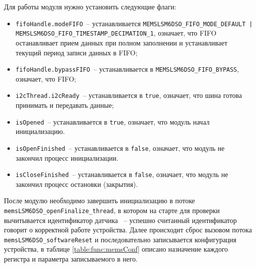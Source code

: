 Для работы модуля нужно установить следующие флаги:

\begin{itemize}
    \item \lstinline{fifoHandle.modeFIFO}~-- устанавливается \lstinline{MEMSLSM6DSO_FIFO_MODE_DEFAULT | MEMSLSM6DSO_FIFO_TIMESTAMP_DECIMATION_1},
    означает, что FIFO останавливает прием данных при полном заполнении и устанавливает текущий период записи данных в FIFO;
    \item \lstinline{fifoHandle.bypassFIFO}~-- устанавливается в \lstinline{MEMSLSM6DSO_FIFO_BYPASS}, означает, что FIFO;
    \item \lstinline{i2cThread.i2cReady}~-- устанавливается в \lstinline{true}, означает, что шина готова принимать и передавать данные;
    \item \lstinline{isOpened}~-- устанавливается в \lstinline{true}, означает, что модуль начал инициализацию.
    \item \lstinline{isOpenFinished}~-- устанавливается в \lstinline{false}, означает, что модуль не закончил процесс инициализации.
    \item \lstinline{isCloseFinished}~-- устанавливается в \lstinline{false}, означает, что модуль не закончил процесс остановки (закрытия).
\end{itemize}

После модулю необходимо завершить инициализацию в потоке \lstinline{memsLSM6DSO_openFinalize_thread}, в котором на старте для проверки вычитывается
идентификатор датчика ~-- успешно считанный идентификатор говорит о корректной работе устройства. Далее происходит сброс вызовом потока
\lstinline{memsLSM6DSO_softwareReset} и последовательно записывается конфигурация устройства, в таблице \ref{table:func:memsConf} описано назначение
каждого регистра и параметра записываемого в него.

